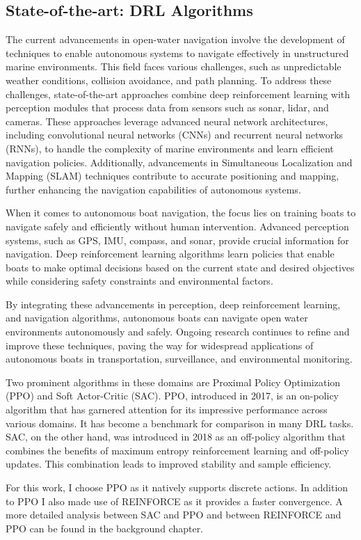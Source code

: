 

\subsection{State-of-the-art: DRL Algorithms}
\begin{textblock}
The current advancements in open-water navigation involve the development of techniques to enable autonomous systems to navigate effectively in unstructured marine environments. This field faces various challenges, such as unpredictable weather conditions, collision avoidance, and path planning. To address these challenges, state-of-the-art approaches combine deep reinforcement learning with perception modules that process data from sensors such as sonar, lidar, and cameras. These approaches leverage advanced neural network architectures, including convolutional neural networks (CNNs) and recurrent neural networks (RNNs), to handle the complexity of marine environments and learn efficient navigation policies. Additionally, advancements in Simultaneous Localization and Mapping (SLAM) techniques contribute to accurate positioning and mapping, further enhancing the navigation capabilities of autonomous systems. 

When it comes to autonomous boat navigation, the focus lies on training boats to navigate safely and efficiently without human intervention. Advanced perception systems, such as GPS, IMU, compass, and sonar, provide crucial information for navigation. Deep reinforcement learning algorithms learn policies that enable boats to make optimal decisions based on the current state and desired objectives while considering safety constraints and environmental factors.

By integrating these advancements in perception, deep reinforcement learning, and navigation algorithms, autonomous boats can navigate open water environments autonomously and safely. Ongoing research continues to refine and improve these techniques, paving the way for widespread applications of autonomous boats in transportation, surveillance, and environmental monitoring. \cite{autonomousvessels2019}\cite{ferreira2020}\cite{christensen2022}\cite{wang2023}\cite{sac2018}

Two prominent algorithms in these domains are Proximal Policy Optimization (PPO)\cite{ppo2017} and Soft Actor-Critic (SAC)\cite{sac2018}. PPO, introduced in 2017, is an on-policy algorithm that has garnered attention for its impressive performance across various domains. It has become a benchmark for comparison in many DRL tasks. SAC, on the other hand, was introduced in 2018 as an off-policy algorithm that combines the benefits of maximum entropy reinforcement learning and off-policy updates. This combination leads to improved stability and sample efficiency.

For this work, I choose PPO as it natively supports discrete actions. In addition to PPO I also made use of REINFORCE as it provides a faster convergence. A more detailed analysis between SAC and PPO and between REINFORCE and PPO can be found in the background chapter.
\end{textblock}



